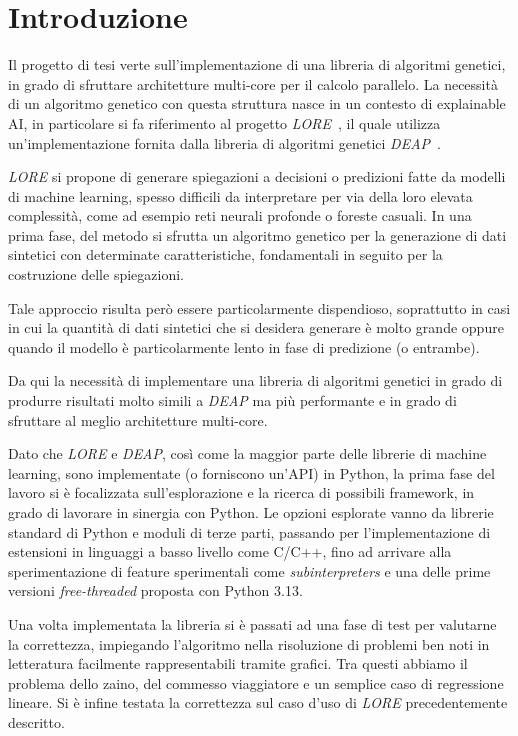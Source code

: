 \chapter*{Introduzione}

Il progetto di tesi verte sull'implementazione di una libreria di algoritmi
genetici, in grado di sfruttare architetture multi-core per il calcolo
parallelo. La necessità di un algoritmo genetico con questa struttura nasce in
un contesto di explainable AI, in particolare si fa riferimento al progetto
\textit{LORE}~\cite{guidotti2018LORE}, il quale utilizza un'implementazione
fornita dalla libreria di algoritmi genetici \textit{DEAP}~\cite{fortin2012DEAP}.

\textit{LORE} si propone di generare spiegazioni a decisioni o predizioni fatte
da modelli di machine learning, spesso difficili da interpretare per via della
loro elevata complessità, come ad esempio reti neurali profonde o foreste
casuali. In una prima fase, del metodo si sfrutta un algoritmo genetico per la
generazione di dati sintetici con determinate caratteristiche, fondamentali in
seguito per la costruzione delle spiegazioni.

Tale approccio risulta però essere particolarmente dispendioso, soprattutto in
casi in cui la quantità di dati sintetici che si desidera generare è molto
grande oppure quando il modello è particolarmente lento in fase di predizione
(o entrambe).

Da qui la necessità di implementare una libreria di algoritmi genetici in grado
di produrre risultati molto simili a \textit{DEAP} ma più performante e in
grado di sfruttare al meglio architetture multi-core.

Dato che \textit{LORE} e \textit{DEAP}, così come la maggior parte delle
librerie di machine learning, sono implementate (o forniscono un'API) in Python,
la prima fase del lavoro si è focalizzata sull'esplorazione e la ricerca di
possibili framework, in grado di lavorare in sinergia con Python. Le opzioni
esplorate vanno da librerie standard di Python e moduli di terze parti, passando
per l'implementazione di estensioni in linguaggi a basso livello come C/C++,
fino ad arrivare alla sperimentazione di feature sperimentali come
\textit{subinterpreters} e una delle prime versioni \textit{free-threaded}
proposta con Python 3.13.

Una volta implementata la libreria si è passati ad una fase di test per
valutarne la correttezza, impiegando l'algoritmo nella risoluzione di problemi
ben noti in letteratura facilmente rappresentabili tramite grafici. Tra questi
abbiamo il problema dello zaino, del commesso viaggiatore e un semplice caso di
regressione lineare. Si è infine testata la correttezza sul caso d'uso di
\textit{LORE} precedentemente descritto.

